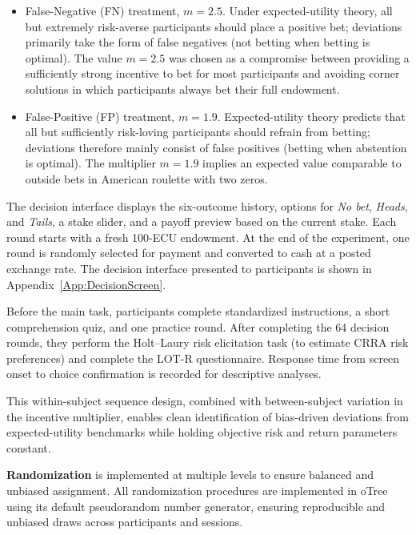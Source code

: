 \documentclass[11pt,a4paper]{article}
\numberwithin{equation}{section}
\begin{document}
\begin{itemize}
\item False-Negative (FN) treatment, \( m = 2.5 \). 
Under expected-utility theory, all but extremely risk-averse participants should place a positive bet; deviations primarily take the form of false negatives (not betting when betting is optimal).
The value \( m = 2.5 \) was chosen as a compromise between providing a sufficiently
strong incentive to bet for most participants and avoiding corner solutions in which
participants always bet their full endowment.

\item False-Positive (FP) treatment, \( m = 1.9 \). Expected-utility theory predicts
that all but sufficiently risk-loving participants should refrain from betting;
deviations therefore mainly consist of false positives (betting when abstention is
optimal). The multiplier \( m = 1.9 \) implies an expected value comparable to outside
bets in American roulette with two zeros.

\end{itemize}

The decision interface displays the six-outcome history, options for \emph{No bet}, \emph{Heads}, and \emph{Tails}, a stake slider, and a payoff preview based on the current stake. 
Each round starts with a fresh 100-ECU endowment. At the end of the experiment,
one round is randomly selected for payment and converted to cash at a posted exchange
rate.
The decision interface presented to participants is shown in Appendix~\ref{App:DecisionScreen}.

Before the main task, participants complete standardized instructions, a short
comprehension quiz, and one practice round. After completing the 64 decision rounds,
they perform the Holt--Laury risk elicitation task (to estimate CRRA risk preferences)
and complete the LOT-R questionnaire. Response time from screen onset to choice
confirmation is recorded for descriptive analyses.

This within-subject sequence design, combined with between-subject variation in the
incentive multiplier, enables clean identification of bias-driven deviations from
expected-utility benchmarks while holding objective risk and return parameters
constant.


\textbf{Randomization} is implemented at multiple levels to ensure balanced and unbiased assignment. All randomization procedures are implemented in oTree using its default pseudorandom number generator, ensuring reproducible and unbiased draws across participants and sessions.
\end{document}
